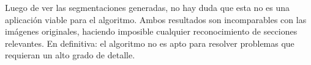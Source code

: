 \begin{figure}[H]
	\begin{center}
	\hspace{3mm}
	\caption{}
	\end{center}
\end{figure}
\vspace{-7mm}

\indent Luego de ver las segmentaciones generadas, no hay duda que esta no es una aplicaci\'on viable para el algoritmo. Ambos resultados son incomparables con las im\'agenes originales, haciendo imposible cualquier reconocimiento de secciones relevantes. En definitiva: el algoritmo no es apto para resolver problemas que requieran un alto grado de detalle. 